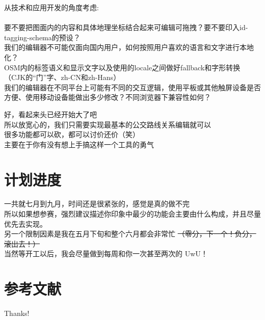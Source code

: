 \documentclass{beamer}
\begin{document}
\begin{frame}
    \large
    从技术和应用开发的角度考虑: \\
    \\
    要不要把图面内的内容和具体地理坐标结合起来可编辑可拖拽？要不要印入id-tagging-schema的预设？\\
    我们的编辑器不可能仅面向国内用户，如何按照用户喜欢的语言和文字进行本地化？\\
    OSM内的标签语义和显示文字以及使用的locale之间做好fallback和字形转换（CJK的“门”字、zh-CN和zh-Hans）\\
    我们的编辑器在不同平台上可能有不同的交互逻辑，使用平板或其他触屏设备是否方便、使用移动设备能做出多少修改？不同浏览器下兼容性如何？
\end{frame}

\begin{frame}
    \Large
    好，看起来头已经开始大了吧 \\
    所以放宽心的，我们只需要实现最基本的公交路线关系编辑就可以 \\
    很多功能都可以砍，都可以讨价还价（笑）\\
    主要在于你有没有想上手搞这样一个工具的勇气
\end{frame}

\section{计划进度}
\begin{frame}
    一共就七月到九月，时间还是很紧张的，感觉是真的做不完 \\
    
    所以如果想参赛，强烈建议描述你印象中最少的功能会主要由什么构成，并且尽量优先去实现。\\

    另一个限制因素是我在五月下旬和整个六月都会非常忙
    \sout{（零分，下一个！负分，滚出去！）}\\

    当然等开工以后，我会尽量做到每周和你一次甚至两次的 UwU！
\end{frame}


\section{参考文献}

\begin{frame}[allowframebreaks]
    
    
\end{frame}

\begin{frame}
    \begin{center}
        {\Huge\calligra Thanks!}
    \end{center}
\end{frame}
\end{document}
